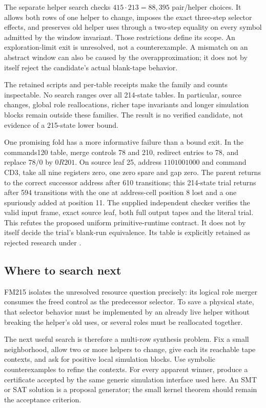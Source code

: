 \documentclass[11pt,a4paper]{article}
\begin{document}
The separate helper search checks $415\cdot213=88{,}395$ pair/helper
choices. It allows both rows of one helper to change, imposes the exact
three-step selector effects, and preserves old helper uses through a
two-step equality on every symbol admitted by the window invariant.
Those restrictions define its scope. An exploration-limit exit is
unresolved, not a counterexample. A mismatch on an abstract window can
also be caused by the overapproximation; it does not by itself reject the
candidate's actual blank-tape behavior.

The retained scripts and per-table receipts make the family and counts
inspectable. No search ranges over all 214-state tables. In particular,
source changes, global role reallocations, richer tape invariants and
longer simulation blocks remain outside these families. The result is no
verified candidate, not evidence of a 215-state lower bound.

One promising fold has a more informative failure than a bound exit. In
the commands120 table, merge controls 78 and 210, redirect entries to 78,
and replace $78/0$ by $0R201$. On source leaf 25, address
$1101001000$ and command CD3, take all nine registers zero, one zero spare
and gap zero. The parent returns to the correct successor address after
610 transitions; this 214-state trial returns after 594 transitions with
the one at address-cell position 8 lost and a one spuriously added at
position 11. The supplied independent checker verifies the valid input
frame, exact source leaf, both full output tapes and the literal trial.
This refutes the proposed uniform primitive-runtime contract. It does not
by itself decide the trial's blank-run equivalence. Its table is explicitly
retained as rejected research under .

\subsection{Where to search next}

FM215 isolates the unresolved resource question precisely: its logical
role merger consumes the freed control as the predecessor selector. To
save a physical state, that selector behavior must be implemented by an
already live helper without breaking the helper's old uses, or several
roles must be reallocated together.

The next useful search is therefore a multi-row synthesis problem. Fix a
small neighborhood, allow two or more helpers to change, give each its
reachable tape contexts, and ask for positive local simulation blocks.
Use symbolic counterexamples to refine the contexts. For every apparent
winner, produce a certificate accepted by the same generic simulation
interface used here. An SMT or SAT solution is a proposal generator; the
small kernel theorem should remain the acceptance criterion.
\end{document}
